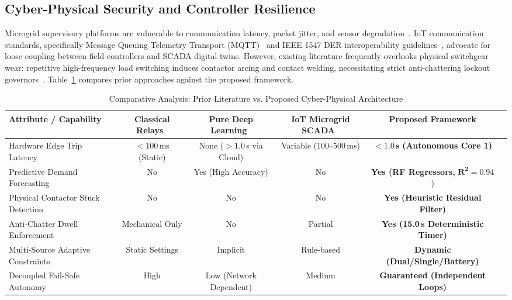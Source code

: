\documentclass[journal,10pt,twocolumn]{IEEEtran}
\begin{document}
\subsection{Cyber-Physical Security and Controller Resilience}
Microgrid supervisory platforms are vulnerable to communication latency, packet jitter, and sensor degradation~\cite{ten2008vulnerability, taormina2017cyber}. IoT communication standards, specifically Message Queuing Telemetry Transport (MQTT)~\cite{light2017mosquitto} and IEEE 1547 DER interoperability guidelines~\cite{ieee1547_2018}, advocate for loose coupling between field controllers and SCADA digital twins. However, existing literature frequently overlooks physical switchgear wear: repetitive high-frequency load switching induces contactor arcing and contact welding, necessitating strict anti-chattering lockout governors~\cite{gungor2011smart}. Table~\ref{tab:related_work} compares prior approaches against the proposed framework.

\begin{table}[t]
\centering
\caption{Comparative Analysis: Prior Literature vs. Proposed Cyber-Physical Architecture}
\label{tab:related_work}
\begin{tabular}{@{}lccccc@{}}
\toprule
\textbf{Attribute / Capability} & \textbf{Classical Relays~\cite{bollen2000understanding}} & \textbf{Pure Deep Learning~\cite{mocanu2016deep}} & \textbf{IoT Microgrid SCADA~\cite{shapsough2018iot}} & \textbf{Proposed Framework} \\ \midrule
Hardware Edge Trip Latency & $<100$\,ms (Static) & None ($>1.0$\,s via Cloud) & Variable ($100$--$500$\,ms) & $\mathbf{<1.0\,s}$ \textbf{(Autonomous Core 1)} \\
Predictive Demand Forecasting & No & Yes (High Accuracy) & No & \textbf{Yes (RF Regressors,} $\mathbf{R^2=0.94}$) \\
Physical Contactor Stuck Detection & No & No & No & \textbf{Yes (Heuristic Residual Filter)} \\
Anti-Chatter Dwell Enforcement & Mechanical Only & No & Partial & \textbf{Yes (15.0\,s Deterministic Timer)} \\
Multi-Source Adaptive Constraints & Static Settings & Implicit & Rule-based & \textbf{Dynamic (Dual/Single/Battery)} \\
Decoupled Fail-Safe Autonomy & High & Low (Network Dependent) & Medium & \textbf{Guaranteed (Independent Loops)} \\ \bottomrule
\end{tabular}
\end{table}
\end{document}
